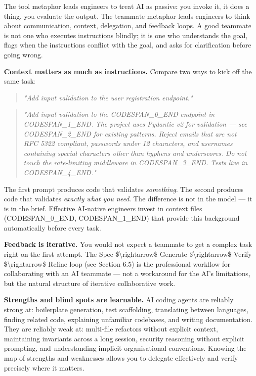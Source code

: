 \documentclass[11pt,a4paper]{book}
\begin{document}
The tool metaphor leads engineers to treat AI as passive: you invoke it, it does a thing, you evaluate the output. The teammate metaphor leads engineers to think about communication, context, delegation, and feedback loops. A good teammate is not one who executes instructions blindly; it is one who understands the goal, flags when the instructions conflict with the goal, and asks for clarification before going wrong.

\textbf{Context matters as much as instructions.} Compare two ways to kick off the same task:

\begin{quote}
\textit{\textit{"Add input validation to the user registration endpoint."}}
\end{quote}

\begin{quote}
\textit{\textit{"Add input validation to the CODESPAN\_0\_END endpoint in CODESPAN\_1\_END. The project uses Pydantic v2 for validation --- see CODESPAN\_2\_END for existing patterns. Reject emails that are not RFC 5322 compliant, passwords under 12 characters, and usernames containing special characters other than hyphens and underscores. Do not touch the rate-limiting middleware in CODESPAN\_3\_END. Tests live in CODESPAN\_4\_END."}}
\end{quote}

The first prompt produces code that validates \textit{something}. The second produces code that validates \textit{exactly what you need}. The difference is not in the model --- it is in the brief. Effective AI-native engineers invest in context files (CODESPAN\_0\_END, CODESPAN\_1\_END) that provide this background automatically before every task.

\textbf{Feedback is iterative.} You would not expect a teammate to get a complex task right on the first attempt. The Spec \$\textbackslash{}rightarrow\$ Generate \$\textbackslash{}rightarrow\$ Verify \$\textbackslash{}rightarrow\$ Refine loop (see Section 6.5) is the professional workflow for collaborating with an AI teammate --- not a workaround for the AI's limitations, but the natural structure of iterative collaborative work.

\textbf{Strengths and blind spots are learnable.} AI coding agents are reliably strong at: boilerplate generation, test scaffolding, translating between languages, finding related code, explaining unfamiliar codebases, and writing documentation. They are reliably weak at: multi-file refactors without explicit context, maintaining invariants across a long session, security reasoning without explicit prompting, and understanding implicit organisational conventions. Knowing the map of strengths and weaknesses allows you to delegate effectively and verify precisely where it matters.
\end{document}
